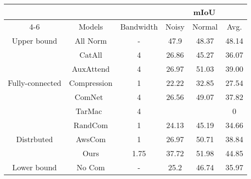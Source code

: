 \begin{table*}
\caption{\textbf{Experimental results on Multiple-Request Multiple-Partial-Support. (Case 6)}}
\label{tab:res_nav_p}
\centering
\begin{tabular}{cccccc}
\toprule
& & & \multicolumn{3}{c}{mIoU }\\
 \cmidrule(lr){4-6} 
& Models & Bandwidth & Noisy & Normal & Avg. \\
\midrule
Upper bound & All Norm & - & 47.9 & 48.37 & 48.14 \\
\midrule
\multirow{5}{*}{ Fully-connected } & CatAll & 4 & 26.86 & 45.27 & 36.07 \\
& AuxAttend & 4 & 26.97 & 51.03 & 39.00 \\
& Compression & 1 & 22.22 & 32.85 & 27.54 \\
& ComNet~\cite{sukhbaatar2016learning} & 4 & 26.56 & 49.07 & 37.82 \\
& TarMac~\cite{das2019tarmac} & 4 & & & 0 \\
\midrule
\multirow{3}{*}{ Distrbuted } & RandCom & 1 & 24.13 & 45.19 & 34.66 \\
& AwsCom & 1 & 26.97 & 50.71 & 38.84 \\
& Ours & 1.75 & 37.72 & 51.98 & 44.85 \\
\midrule
Lower bound & No Com & - & 25.2 & 46.74 & 35.97 \\
\bottomrule
\end{tabular}
\end{table*}



